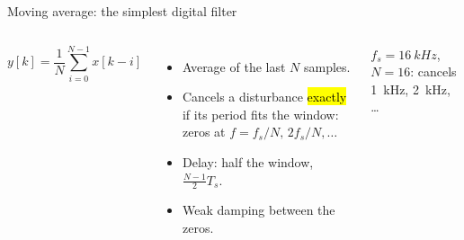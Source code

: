 \documentclass[aspectratio=169,10pt]{beamer}
\newcommand{\dat}[1]{data/#1.dat}
\begin{document}
\begin{frame}{Moving average: the simplest digital filter}
\begin{columns}[T]
\centering
{}
\begin{eqbox}
\vspace{-2mm}
\[
y[k]=\frac1N\sum_{i=0}^{N-1}x[k-i]
\]
\vspace{-4mm}
\end{eqbox}
\begin{itemize}\small
\item Average of the last $N$ samples.
\item Cancels a disturbance \hl{exactly} if its period fits the window: zeros at $f=f_s/N,\,2f_s/N,\dots$
\item Delay: half the window, $\frac{N-1}{2}T_s$.
\item Weak damping between the zeros.
\end{itemize}
\begin{keybox}[Example]
\small $f_s=\SI{16}{kHz}$, $N=16$: cancels \SI{1}{kHz}, \SI{2}{kHz}, \dots
\end{keybox}
\end{columns}
\end{frame}
\end{document}
